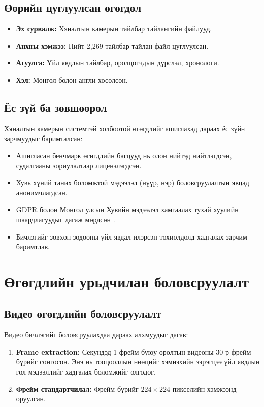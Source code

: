 \subsection{Өөрийн цуглуулсан өгөгдөл}

\begin{itemize}
    \item \textbf{Эх сурвалж:} Хяналтын камерын тайлбар тайлангийн файлууд.
    \item \textbf{Анхны хэмжээ:} Нийт 2,269 тайлбар тайлан файл цуглуулсан.
    \item \textbf{Агуулга:} Үйл явдлын тайлбар, оролцогчдын дүрслэл, хронологи.
    \item \textbf{Хэл:} Монгол болон англи хосолсон.
\end{itemize}

\subsection{Ёс зүй ба зөвшөөрөл}

Хяналтын камерын системтэй холбоотой өгөгдлийг ашиглахад дараах ёс зүйн зарчмуудыг баримталсан:

\begin{itemize}
    \item Ашигласан бенчмарк өгөгдлийн багцууд нь олон нийтэд нийтлэгдсэн, судалгааны зориулалтаар лицензлэгдсэн.
    \item Хувь хүний таних боломжтой мэдээлэл (нүүр, нэр) боловсруулалтын явцад анонимчлагдсан.
    \item GDPR болон Монгол улсын Хувийн мэдээлэл хамгаалах тухай хуулийн шаардлагуудыг дагаж мөрдсөн \cite{gdpr2016}.
    \item Бичлэгийг зөвхөн зодооны үйл явдал илэрсэн тохиолдолд хадгалах зарчим баримтлав.
\end{itemize}

\section{Өгөгдлийн урьдчилан боловсруулалт}

\subsection{Видео өгөгдлийн боловсруулалт}

Видео бичлэгийг боловсруулахдаа дараах алхмуудыг дагав:

\begin{enumerate}
    \item \textbf{Frame extraction:} Секундэд 1 фрейм буюу оролтын видеоны 30-р фрейм бүрийг сонгосон. Энэ нь тооцооллын нөөцийг хэмнэхийн зэрэгцээ үйл явдлын гол мэдээллийг хадгалах боломжийг олгодог.

    \item \textbf{Фрейм стандартчилал:} Фрейм бүрийг $224 \times 224$ пикселийн хэмжээнд оруулсан.
\end{enumerate}

